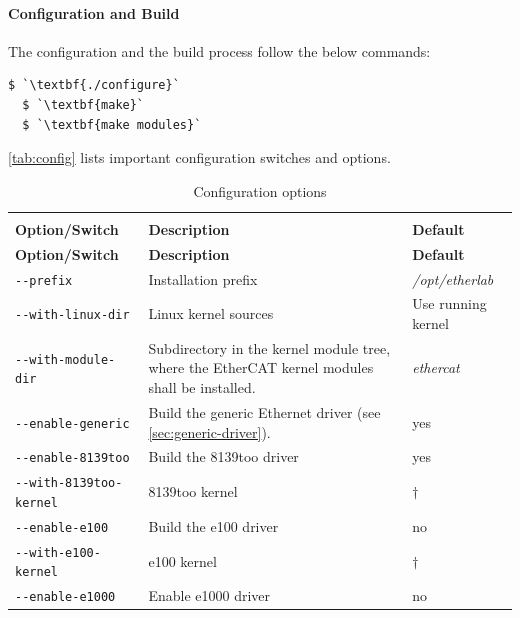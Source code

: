 \documentclass[a4paper,12pt,BCOR6mm,bibtotoc,idxtotoc]{scrbook}
\begin{document}
\paragraph{Configuration and Build} The configuration and the build process
follow the below commands:

\begin{lstlisting}[gobble=2]
  $ `\textbf{./configure}`
  $ `\textbf{make}`
  $ `\textbf{make modules}`
\end{lstlisting}

\autoref{tab:config} lists important configuration switches and options.

\begin{longtable}{l|p{}|l}
  \caption{Configuration options}\rule[-5ex]{0mm}{0mm}
  \label{tab:config}\\

\textbf{Option/Switch} & \textbf{Description} & \textbf{Default}\\\hline
\endfirsthead

\textbf{Option/Switch} & \textbf{Description} & \textbf{Default}\\\hline
\endhead

\lstinline+--prefix+ & Installation prefix & \textit{/opt/etherlab}\\

\lstinline+--with-linux-dir+ & Linux kernel sources & Use running kernel\\

\lstinline+--with-module-dir+ & Subdirectory in the kernel module tree, where
the EtherCAT kernel modules shall be installed. & \textit{ethercat}\\

\hline

\lstinline+--enable-generic+ & Build the generic Ethernet driver (see
\autoref{sec:generic-driver}). & yes\\

\lstinline+--enable-8139too+ & Build the 8139too driver & yes\\

\lstinline+--with-8139too-kernel+ & 8139too kernel & $\dagger$\\

\lstinline+--enable-e100+ & Build the e100 driver & no\\

\lstinline+--with-e100-kernel+ & e100 kernel & $\dagger$\\

\lstinline+--enable-e1000+ & Enable e1000 driver & no\\


\end{longtable}
\end{document}
